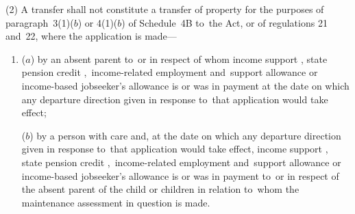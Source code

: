\documentclass[12pt,a4paper]{article}
\begin{document}
(2) A transfer shall not constitute a transfer of property for the purposes of paragraph~3(1)($b$) or 4(1)($b$) of Schedule~4B to~the Act, or of regulations 21 and~22, where the application is made—
\begin{enumerate}\item[]
($a$) by an absent parent to~or in respect of whom income support%
, state pension credit%
,~income-related employment and~support allowance  %
or income-based jobseeker’s allowance is or was in payment at the date on which any departure direction given in response to~that application would take effect;

($b$) by a person with care and, at the date on which any departure direction given in response to~that application would take effect, income support%
, state pension credit%
,~income-related employment and~support allowance  %
or income-based jobseeker’s allowance is or was in payment to~or in respect of the absent parent of the child or children in relation to~whom the maintenance assessment in question is made.
\end{enumerate}
\end{document}
